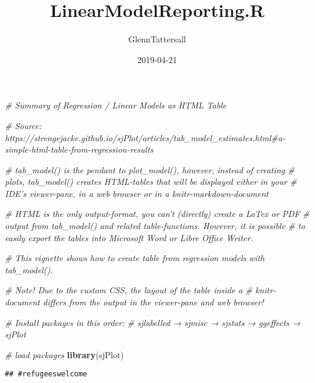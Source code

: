 \documentclass[]{article}
\title{LinearModelReporting.R}
\author{GlennTattersall}
\date{2019-04-21}
\newenvironment{Shaded}{\begin{snugshade}}{\end{snugshade}}
\newcommand{\KeywordTok}[1]{\textcolor[rgb]{0.13,0.29,0.53}{\textbf{#1}}}
\newcommand{\CommentTok}[1]{\textcolor[rgb]{0.56,0.35,0.01}{\textit{#1}}}
\newcommand{\NormalTok}[1]{#1}
\begin{document}
\maketitle

\begin{Shaded}
\begin{Highlighting}[]
\CommentTok{# Summary of Regression / Linear Models as HTML Table}

\CommentTok{# Source: https://strengejacke.github.io/sjPlot/articles/tab_model_estimates.html#a-simple-html-table-from-regression-results}

\CommentTok{# tab_model() is the pendant to plot_model(), however, instead of creating }
\CommentTok{# plots, tab_model() creates HTML-tables that will be displayed either in your }
\CommentTok{# IDE’s viewer-pane, in a web browser or in a knitr-markdown-document }
 
\CommentTok{# HTML is the only output-format, you can’t (directly) create a LaTex or PDF }
\CommentTok{# output from tab_model() and related table-functions. However, it is possible}
\CommentTok{# to easily export the tables into Microsoft Word or Libre Office Writer.}

\CommentTok{# This vignette shows how to create table from regression models with tab_model(). }
 
\CommentTok{# Note! Due to the custom CSS, the layout of the table inside a}
\CommentTok{# knitr-document differs from the output in the viewer-pane and web browser!}
   
\CommentTok{# Install packages in this order:}
\CommentTok{# sjlabelled → sjmisc → sjstats → ggeffects → sjPlot}


\CommentTok{# load packages}
\KeywordTok{library}\NormalTok{(sjPlot)}
\end{Highlighting}
\end{Shaded}

\begin{verbatim}
## #refugeeswelcome
\end{verbatim}
\end{document}
